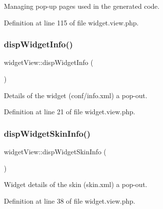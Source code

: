 Managing pop-\/up pages used in the generated code. 



Definition at line 115 of file widget.\+view.\+php.

\hypertarget{classwidgetView_aa0744579c05eacb742561abbc967c720}{}\label{classwidgetView_aa0744579c05eacb742561abbc967c720} 
\subsubsection{\texorpdfstring{disp\+Widget\+Info()}{dispWidgetInfo()}}
{\footnotesize\ttfamily widget\+View\+::disp\+Widget\+Info (\begin{DoxyParamCaption}{ }\end{DoxyParamCaption})}



Details of the widget (conf/info.\+xml) a pop-\/out. 



Definition at line 21 of file widget.\+view.\+php.

\hypertarget{classwidgetView_a7d7203cb8a9ddec4628beb6ae1f55ff5}{}\label{classwidgetView_a7d7203cb8a9ddec4628beb6ae1f55ff5} 
\subsubsection{\texorpdfstring{disp\+Widget\+Skin\+Info()}{dispWidgetSkinInfo()}}
{\footnotesize\ttfamily widget\+View\+::disp\+Widget\+Skin\+Info (\begin{DoxyParamCaption}{ }\end{DoxyParamCaption})}



Widget details of the skin (skin.\+xml) a pop-\/out. 



Definition at line 38 of file widget.\+view.\+php.

\hypertarget{classwidgetView_a0bc95329be4497bd1b8dbb7702b51e2c}{}\label{classwidgetView_a0bc95329be4497bd1b8dbb7702b51e2c} 
